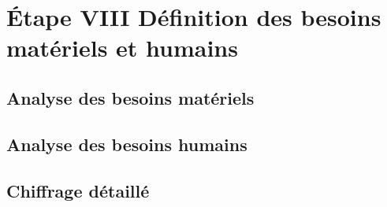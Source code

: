 \section{Étape VIII \textendash{} Définition des besoins matériels et humains}

\subsection{Analyse des besoins matériels}
\subsection{Analyse des besoins humains}
\subsection{Chiffrage détaillé}
